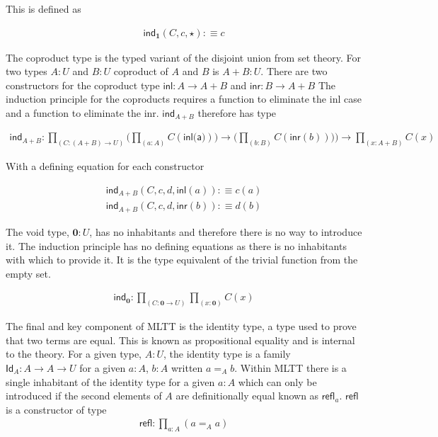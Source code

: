This is defined as

\begin{align*}
    \textsf{ind}_{\textbf{1}}(C,c,\star) :\equiv c
\end{align*}

The coproduct type is the typed variant of the disjoint union from set theory.
For two types $A : U$ and $B : U$ coproduct of $A$ and $B$ is $A + B : U$. There
are two constructors for the coproduct type $\textsf{inl} : A \rightarrow A + B$
and $\textsf{inr} : B \rightarrow A + B$ The induction principle for the
coproducts requires a function to eliminate the \textsf{inl} case and a function
to eliminate the \textsf{inr}. $\textsf{ind}_{A+B}$ therefore has type

\begin{align*}
    \textsf{ind}_{A+B} : \prod_{(C:(A+B)\rightarrow
    U)}\Big(\prod_{(a:A)}C(\textsf{inl(a)})\Big) \rightarrow
\Big(\prod_{(b : B)}C(\textsf{inr}(b)))\Big) \rightarrow \prod_{(x:A+B)}C(x)
\end{align*}

With a defining equation for each constructor

\begin{align*}
    \textsf{ind}_{A+B}(C,c,d,\textsf{inl}(a)) :\equiv c(a) \\
    \textsf{ind}_{A+B}(C,c,d,\textsf{inr}(b)) :\equiv d(b)
\end{align*}

The void type, $\textbf{0} : U$, has no inhabitants and therefore there is no
way to introduce it. The induction principle has no defining equations as there
is no inhabitants with which to provide it. It is the type equivalent of the
trivial function from the empty set.

\begin{align*}
    \textsf{ind}_{\textbf{0}} : \prod_{(C : \textbf{0} \rightarrow
    U)}\prod_{(x:\textbf{0})}C(x)
\end{align*}

The final and key component of MLTT is the identity type, a type used to prove
that two terms are equal. This is known as propositional equality and is
internal to the theory. For a given type, $A : U$, the identity type is a family
$\textsf{Id}_{A} : A \rightarrow A \rightarrow U$ for a given $a : A$, $b : A$
written $a =_{A} b$. Within MLTT there is a single inhabitant of the identity
type for a given  $a : A$  which can only be introduced if the second elements
of $A$ are definitionally equal known as $\textsf{refl}_{a}$. $\textsf{refl}$ is
a constructor of type
\begin{align*}
    \textsf{refl} : \prod_{a : A}(a =_{A} a)
\end{align*}


